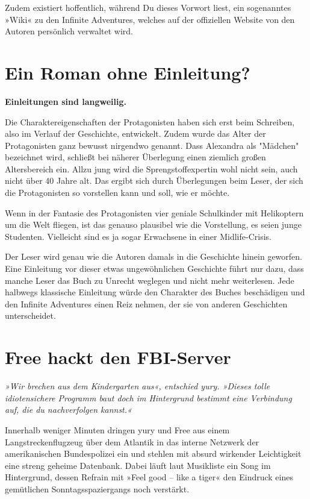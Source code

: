 Zudem existiert hoffentlich, während Du dieses Vorwort liest, ein sogenanntes »Wiki« zu den Infinite Adventures, welches auf der offiziellen Website von den Autoren persönlich verwaltet wird.


\chapter{Ein Roman ohne Einleitung?}

\begin{center}
    \textbf{Einleitungen sind langweilig.}
\end{center}

Die Charaktereigenschaften der Protagonisten haben sich erst beim Schreiben, also im Verlauf der Geschichte, entwickelt. Zudem wurde das Alter der Protagonisten ganz bewusst nirgendwo genannt. Dass Alexandra als "Mädchen" bezeichnet wird, schließt bei näherer Überlegung einen ziemlich großen Altersbereich ein. Allzu jung wird die Sprengstoffexpertin wohl nicht sein, auch nicht über 40 Jahre alt. Das ergibt sich durch Überlegungen beim Leser, der sich die Protagonisten so vorstellen kann und soll, wie er möchte.

Wenn in der Fantasie des Protagonisten vier geniale Schulkinder mit Helikoptern um die Welt fliegen, ist das genauso plausibel wie die Vorstellung, es seien junge Studenten. Vielleicht sind es ja sogar Erwachsene in einer Midlife-Crisis.

Der Leser wird genau wie die Autoren damals in die Geschichte hinein geworfen. Eine Einleitung vor dieser etwas ungewöhnlichen Geschichte führt nur dazu, dass manche Leser das Buch zu Unrecht weglegen und nicht mehr weiterlesen. Jede halbwegs klassische Einleitung würde den Charakter des Buches beschädigen und den Infinite Adventures einen Reiz nehmen, der sie von anderen Geschichten unterscheidet.


\chapter{Free hackt den FBI-Server}

\textit{»Wir brechen aus dem Kindergarten aus«, entschied yury. »Dieses tolle idiotensichere Programm baut doch im Hintergrund bestimmt eine Verbindung auf, die du nachverfolgen kannst.«}

\bigskip

Innerhalb weniger Minuten dringen yury und Free aus einem Langstreckenflugzeug über dem Atlantik in das interne Netzwerk der amerikanischen Bundespolizei ein und stehlen mit absurd wirkender Leichtigkeit eine streng geheime Datenbank. Dabei läuft laut Musikliste ein Song im Hintergrund, dessen Refrain mit »Feel good – like a tiger« den Eindruck eines gemütlichen Sonntagsspaziergangs noch verstärkt.

